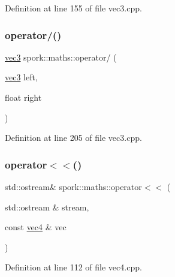 Definition at line 155 of file vec3.\+cpp.

\mbox{\label{namespacespork_1_1maths_ac6eca6058f88e8b4f6c1a5567f109b2c}} 
\subsubsection{\texorpdfstring{operator/()}{operator/()}\hspace{0.1cm}{\footnotesize\ttfamily [4/4]}}
{\footnotesize\ttfamily \hyperlink{structspork_1_1maths_1_1vec3}{vec3} spork\+::maths\+::operator/ (\begin{DoxyParamCaption}\item[{\hyperlink{structspork_1_1maths_1_1vec3}{vec3}}]{left,  }\item[{float}]{right }\end{DoxyParamCaption})}



Definition at line 205 of file vec3.\+cpp.

\mbox{\label{namespacespork_1_1maths_a8cf0d7b0a5f64f0f6319f0b922eda679}} 
\subsubsection{\texorpdfstring{operator$<$$<$()}{operator<<()}\hspace{0.1cm}{\footnotesize\ttfamily [1/3]}}
{\footnotesize\ttfamily std\+::ostream\& spork\+::maths\+::operator$<$$<$ (\begin{DoxyParamCaption}\item[{std\+::ostream \&}]{stream,  }\item[{const \hyperlink{structspork_1_1maths_1_1vec4}{vec4} \&}]{vec }\end{DoxyParamCaption})}



Definition at line 112 of file vec4.\+cpp.

\mbox{\label{namespacespork_1_1maths_ac11436d48bae0e63231b32507faa5985}} 
